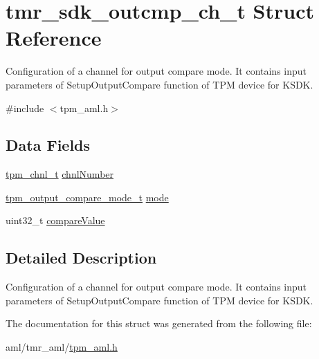 \hypertarget{structtmr__sdk__outcmp__ch__t}{}\section{tmr\+\_\+sdk\+\_\+outcmp\+\_\+ch\+\_\+t Struct Reference}
\label{structtmr__sdk__outcmp__ch__t}


Configuration of a channel for output compare mode. It contains input parameters of Setup\+Output\+Compare function of T\+PM device for K\+S\+DK.  




{\ttfamily \#include $<$tpm\+\_\+aml.\+h$>$}

\subsection*{Data Fields}
\begin{DoxyCompactItemize}
\item 
\mbox{\hyperlink{group__tpm_gacda6962369e014c8ac72d1b58b224deb}{tpm\+\_\+chnl\+\_\+t}} \mbox{\hyperlink{group__struct__group_gaddc94dba6576d0b40cd83b493968a2e4}{chnl\+Number}}
\item 
\mbox{\hyperlink{group__tpm_gae76bda507d28f3c302f4cdfeee61ba5e}{tpm\+\_\+output\+\_\+compare\+\_\+mode\+\_\+t}} \mbox{\hyperlink{group__struct__group_gaf5112494d3efec9f7706606b8405a35f}{mode}}
\item 
uint32\+\_\+t \mbox{\hyperlink{group__struct__group_gae39f1dfd1bc42feaeb879d5d2eb2249b}{compare\+Value}}
\end{DoxyCompactItemize}


\subsection{Detailed Description}
Configuration of a channel for output compare mode. It contains input parameters of Setup\+Output\+Compare function of T\+PM device for K\+S\+DK. 

The documentation for this struct was generated from the following file\+:\begin{DoxyCompactItemize}
\item 
aml/tmr\+\_\+aml/\mbox{\hyperlink{tpm__aml_8h}{tpm\+\_\+aml.\+h}}\end{DoxyCompactItemize}
